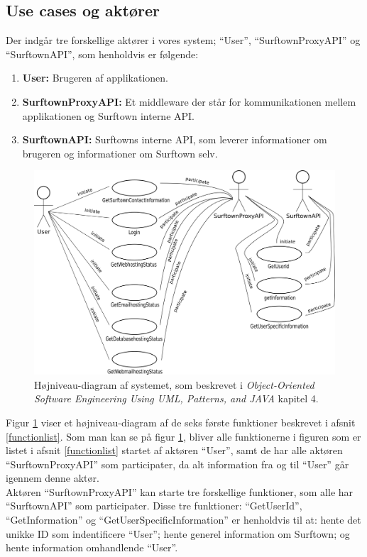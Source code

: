 \documentclass[12pt]{article}
\begin{document}
\subsection{Use cases og aktører}
Der indgår tre forskellige aktører i vores system; ``User'', ``SurftownProxyAPI'' og ``SurftownAPI'', som henholdvis er følgende:
\begin{enumerate}
	\item{\textbf{User: } Brugeren af applikationen.}
	\item{\textbf{SurftownProxyAPI: } Et middleware der står for kommunikationen mellem applikationen og Surftown interne API.}
	\item{\textbf{SurftownAPI: } Surftowns interne API, som leverer informationer om brugeren og informationer om Surftown selv.}
\end{enumerate}
\newpage
\begin{figure}
	\centering
	\includegraphics[width=13cm]{high_level_diagramv2.png}
	\caption{Højniveau-diagram af systemet, som beskrevet i \emph{Object-Oriented Software Engineering Using UML, Patterns, and JAVA}\cite{OOSE} kapitel 4.}
	\label{highleveldiagram}
\end{figure}
Figur \ref{highleveldiagram} viser et højniveau-diagram af de seks første funktioner beskrevet i afsnit \ref{functionlist}. Som man kan se på figur \ref{highleveldiagram}, bliver alle funktionerne i figuren som er listet i afsnit \ref{functionlist} startet af aktøren ``User'', samt de har alle aktøren ``SurftownProxyAPI'' som participater, da alt information fra og til ``User'' går igennem denne aktør.\\Aktøren ``SurftownProxyAPI'' kan starte tre forskellige funktioner, som alle har ``SurftownAPI'' som participater. Disse tre funktioner: ``GetUserId'', ``GetInformation'' og ``GetUserSpecificInformation'' er henholdvis til at: hente det unikke ID som indentificere ``User''; hente generel information om Surftown; og hente information omhandlende ``User''. 
\end{document}
